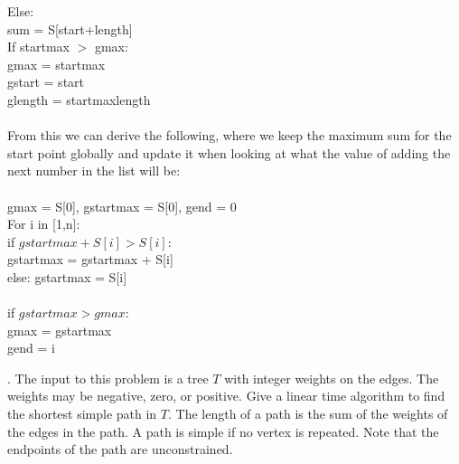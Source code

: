 \documentclass[10pt]{article}
\newcommand{\tab}{\hspace*{2em}}
\newcommand{\tabb}{\hspace*{4em}}
\newcommand{\tabbb}{\hspace*{6em}}
\begin{document}
			\tabb Else:\\
			\tabbb sum = S[start+length]\\
			\tab If startmax $>$ gmax:\\
			\tabb gmax = startmax\\
			\tabb gstart = start\\
			\tabb glength = startmaxlength\\
			\\
			\noindent
			From this we can derive the following, where we keep the maximum sum for the start point globally and update it when looking at what the value of adding the next number in the list will be:\\ 
			\\
			\newpage
			\noindent
			gmax = S[0], gstartmax = S[0], gend = 0\\
			For i in [1,n]:\\
			\tab if $gstartmax + S[i] > S[i]$:\\
			\tabb gstartmax = gstartmax + S[i]\\
			\tab else: gstartmax = S[i]\\
			\\
			\tab if $gstartmax > gmax$:\\
			\tabb gmax = gstartmax\\
			\tabb gend = i  
			
			
			\newpage
			.	The input to this problem is a tree $T$ with integer weights on the edges. The weights may be negative,
			zero, or positive.  Give a linear time algorithm to find the shortest simple path in $T$.  The length of a
			path is the sum of the weights of the edges in the path. A path is simple if no vertex is repeated. Note
			that the endpoints of the path are unconstrained.\\
			\\
\end{document}
